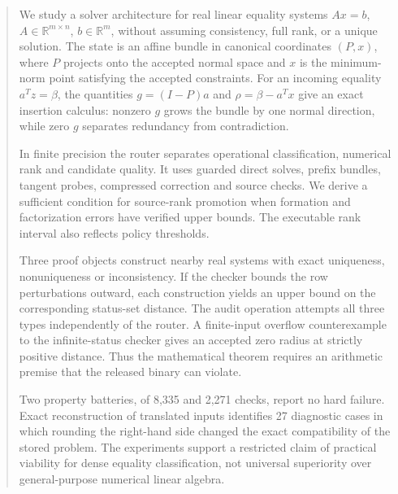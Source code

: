 %
%

\begin{abstract}
We study a solver architecture for real linear equality systems
\(Ax=b\), \(A\in\mathbb{R}^{m\times n}\), \(b\in\mathbb{R}^m\), without
assuming consistency, full rank, or a unique solution. The state is an affine
bundle in canonical coordinates \((P,x)\), where \(P\) projects onto the
accepted normal space and \(x\) is the minimum-norm point satisfying the
accepted constraints. For an incoming equality \(a^Tz=\beta\), the quantities
\(g=(I-P)a\) and \(\rho=\beta-a^Tx\) give an exact insertion calculus:
nonzero \(g\) grows the bundle by one normal direction, while zero \(g\)
separates redundancy from contradiction.

In finite precision the router separates operational classification, numerical rank and candidate quality. It uses guarded direct solves, prefix bundles, tangent probes, compressed correction and source checks. We derive a sufficient condition for source-rank promotion when formation and factorization errors have verified upper bounds. The executable rank interval also reflects policy thresholds.

Three proof objects construct nearby real systems with exact uniqueness, nonuniqueness or inconsistency. If the checker bounds the row perturbations outward, each construction yields an upper bound on the corresponding status-set distance. The audit operation attempts all three types independently of the router. A finite-input overflow counterexample to the infinite-status checker gives an accepted zero radius at strictly positive distance. Thus the mathematical theorem requires an arithmetic premise that the released binary can violate.

Two property batteries, of 8{,}335 and 2{,}271 checks, report no hard
failure. Exact reconstruction of translated inputs identifies 27 diagnostic cases in which rounding the right-hand side changed the exact compatibility of the stored problem. The experiments support a restricted claim of practical viability
for dense equality classification, not universal superiority over
general-purpose numerical linear algebra.
\end{abstract}
